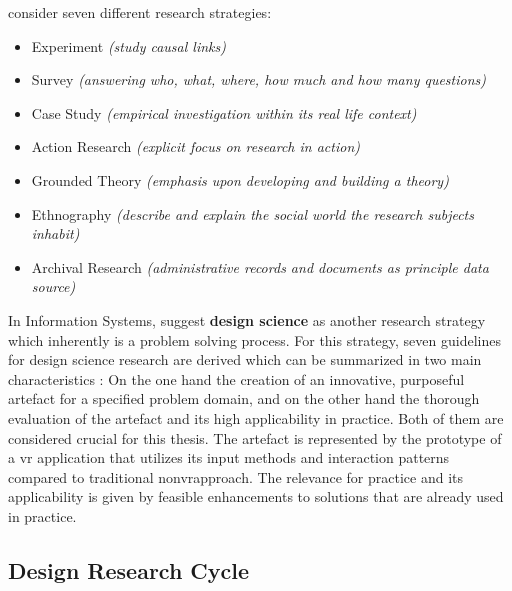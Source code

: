 \cite{Saunders2009} consider seven different research strategies:
\begin{itemize}[noitemsep,nolistsep]
	\item Experiment \textit{(study causal links)}
	\item Survey \textit{(answering who, what, where, how much and how many questions)}
	\item Case Study \textit{(empirical investigation within its real life context)}
	\item Action Research \textit{(explicit focus on research in action)}
	\item Grounded Theory \textit{(emphasis upon developing and building a theory)}
	\item Ethnography \textit{(describe and explain the social world the research subjects inhabit)}
	\item Archival Research \textit{(administrative records and documents as principle data source)}
\end{itemize}
In Information Systems, \cite{Hevner2010} suggest \textbf{design science} as another research strategy which inherently is a problem solving process. For this strategy, seven guidelines for design science research are derived which can be summarized in two main characteristics \citep{Hevner2010}: On the one hand the creation of an innovative, purposeful artefact for a specified problem domain, and on the other hand the thorough evaluation of the artefact and its high applicability in practice. Both of them are considered crucial for this thesis. \newline
The artefact is represented by the prototype of a \gls{vr} application that utilizes its input methods and interaction patterns compared to traditional non\gls{vr}approach. The relevance for practice and its applicability is given by feasible enhancements to solutions that are already used in practice.



\subsection{Design Research Cycle}

\label{DSRCycle}

